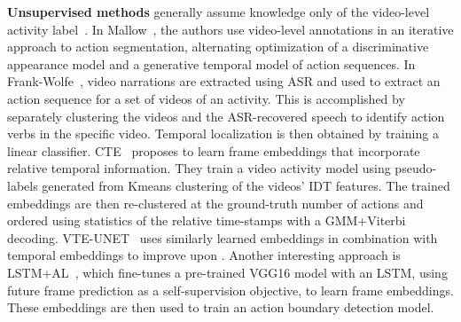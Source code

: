 \documentclass[10pt,twocolumn,letterpaper]{article}
\begin{document}
\noindent\textbf{Unsupervised methods} generally assume knowledge only of the video-level activity label~\cite{mallow, yti_paper, ute_paper, lstm_al,vt_unet}.
In Mallow~\cite{mallow}, the authors use video-level annotations in an iterative approach to action segmentation, alternating optimization of a discriminative appearance model and a generative temporal model of action sequences.
In Frank-Wolfe~\cite{yti_paper}, video narrations are extracted using ASR and used to extract an action sequence for a set of videos of an activity. This is accomplished by separately clustering the videos and the ASR-recovered speech to identify action verbs in the specific video. Temporal localization is then obtained by training a linear classifier. CTE~\cite{ute_paper} proposes to learn frame embeddings that incorporate relative temporal information. They train a video activity model using pseudo-labels generated from Kmeans clustering of the videos' IDT features. The trained embeddings are then re-clustered at the ground-truth number of actions and ordered using statistics of the relative time-stamps with a GMM+Viterbi decoding. VTE-UNET~\cite{vt_unet} uses similarly learned embeddings in combination with temporal embeddings to improve upon \cite{ute_paper}. Another interesting approach is
LSTM+AL~\cite{lstm_al}, which fine-tunes a pre-trained VGG16 model with an LSTM, using future frame prediction as a self-supervision objective, to learn frame embeddings. These embeddings are then used to train an action boundary detection model.
\end{document}

